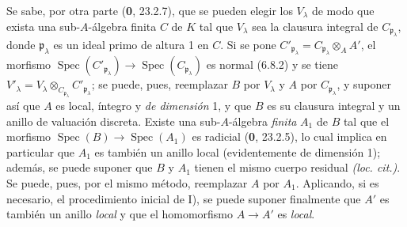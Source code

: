Se sabe, por otra parte (\textbf{0}, 23.2.7), que se pueden elegir los
$V_\lambda$ de modo que exista una sub-$A$-álgebra finita $C$ de $K$
tal que $V_\lambda$ sea la clausura integral de
$C_{\mathfrak p_\lambda}$, donde $\mathfrak p_\lambda$ es un ideal
primo de altura 1 en $C$. Si se pone
$C'_{\mathfrak p_\lambda}=C_{\mathfrak p_\lambda}\otimes_A A'$, el
morfismo $\operatorname{Spec}(C'_{\mathfrak p_\lambda})\to
\operatorname{Spec}(C_{\mathfrak p_\lambda})$ es normal (6.8.2) y se
tiene $V'_\lambda=V_\lambda\otimes_{C_{\mathfrak p_\lambda}}
C'_{\mathfrak p_\lambda}$; se puede, pues, reemplazar $B$ por
$V_\lambda$ y $A$ por $C_{\mathfrak p_\lambda}$, y suponer así que
$A$ es local, íntegro y \emph{de dimensión} 1, y que $B$ es su
clausura integral y un anillo de valuación discreta. Existe una
sub-$A$-álgebra \emph{finita} $A_1$ de $B$ tal que el morfismo
$\operatorname{Spec}(B)\to\operatorname{Spec}(A_1)$ es radicial
(\textbf{0}, 23.2.5), lo cual implica en particular que $A_1$ es también un
anillo local (evidentemente de dimensión 1); además, se puede suponer
que $B$ y $A_1$ tienen el mismo cuerpo residual \emph{(loc. cit.)}.
Se puede, pues, por el mismo método, reemplazar $A$ por $A_1$.
Aplicando, si es necesario, el procedimiento inicial de I), se puede
suponer finalmente que $A'$ es también un anillo \emph{local} y que el
homomorfismo $A\to A'$ es \emph{local}.
